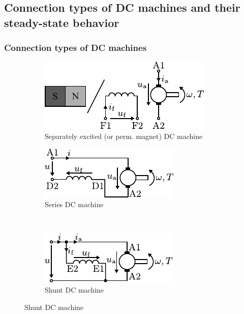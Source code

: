 \subsection{Connection types of DC machines and their steady-state behavior}

\begin{frame}
	\frametitle{Connection types of DC machines}
	\vspace{-0.1cm}
	\begin{figure}
		\ContinuedFloat
		\centering
		\begin{subfigure}[b]{0.49\textwidth}
			\centering
			\includegraphics[scale=1.2]{fig/lec03/Separately_excited_DC_machine.pdf}
			\caption{Separately excited (or perm. magnet) DC machine} 
		\end{subfigure}
		\hfill
		\begin{subfigure}[b]{0.49\textwidth}
			\centering
			\includegraphics[scale=1.2]{fig/lec03/Series_DC_machine.pdf}
			\caption{Series DC machine} 
		\end{subfigure}
		\\
		\begin{subfigure}[b]{0.49\textwidth}
			\centering
			\includegraphics[scale=1.2]{fig/lec03/Shunt_DC_machine.pdf}
			\caption{Shunt DC machine} 
		\end{subfigure}

\end{figure}
\end{frame}

